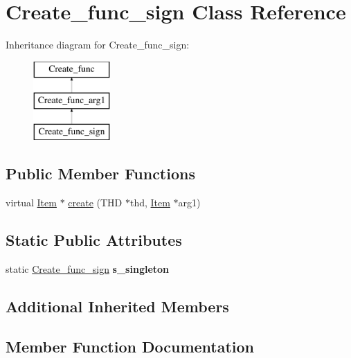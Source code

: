 \hypertarget{classCreate__func__sign}{}\section{Create\+\_\+func\+\_\+sign Class Reference}
\label{classCreate__func__sign}
Inheritance diagram for Create\+\_\+func\+\_\+sign\+:\begin{figure}[H]
\begin{center}
\leavevmode
\includegraphics[height=3.000000cm]{classCreate__func__sign}
\end{center}
\end{figure}
\subsection*{Public Member Functions}
\begin{DoxyCompactItemize}
\item 
virtual \mbox{\hyperlink{classItem}{Item}} $\ast$ \mbox{\hyperlink{classCreate__func__sign_a4a157a8a2f7ec28aba70766720f57808}{create}} (T\+HD $\ast$thd, \mbox{\hyperlink{classItem}{Item}} $\ast$arg1)
\end{DoxyCompactItemize}
\subsection*{Static Public Attributes}
\begin{DoxyCompactItemize}
\item 
\mbox{\label{classCreate__func__sign_afc8b51139474596ee2b3502dce9757a5}} 
static \mbox{\hyperlink{classCreate__func__sign}{Create\+\_\+func\+\_\+sign}} {\bfseries s\+\_\+singleton}
\end{DoxyCompactItemize}
\subsection*{Additional Inherited Members}


\subsection{Member Function Documentation}
\mbox{\label{classCreate__func__sign_a4a157a8a2f7ec28aba70766720f57808}} 
